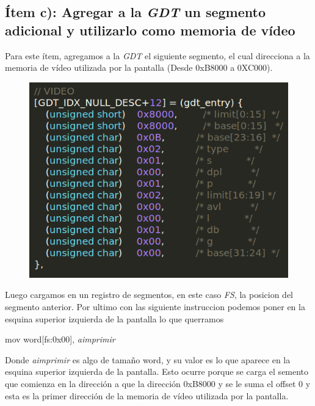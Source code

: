 \subsection{Ítem c): Agregar a la \textit{GDT}  un segmento adicional y utilizarlo como memoria de vídeo}

Para este ítem, agregamos a la \textit{GDT} el siguiente segmento, el cual direcciona a la memoria de vídeo utilizada por la pantalla (Desde 0xB8000 a 0XC000).

\begin{figure}[H]
\begin{center}
  \includegraphics[width=\linewidth]{ejercicio1/memvid.png}
  \caption{{\small}} 
\endminipage
\end{center}
\end{figure}


Luego cargamos en un registro de segmentos, en este caso  \textit{FS}, la posicion del segmento anterior. Por ultimo con las siguiente instruccion podemos poner en la esquina superior izquierda de la pantalla lo que querramos
\begin{center}
mov word[fs:0x00],  \textit{aimprimir}
\end{center}

Donde  \textit{aimprimir} es algo de tamaño word, y su valor es lo que aparece en la esquina superior izquierda de la pantalla. Esto ocurre porque se carga el semento que comienza en la dirección a que la dirección 0xB8000 y se le suma el offset 0 y esta es la primer dirección de la memoria de vídeo utilizada por la pantalla.\\

